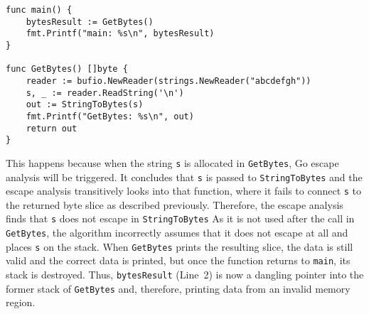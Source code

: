\begin{lstlisting}[language=Golang, label=lst:escape-analysis, caption=Escape analysis flaw example, float, belowskip=-1.5em]
func main() {
	bytesResult := GetBytes()
	fmt.Printf("main: %s\n", bytesResult)
}

func GetBytes() []byte {
	reader := bufio.NewReader(strings.NewReader("abcdefgh"))
	s, _ := reader.ReadString('\n')
	out := StringToBytes(s)
	fmt.Printf("GetBytes: %s\n", out)
	return out
}
\end{lstlisting}

This happens because when the string \texttt{s} is allocated in \texttt{GetBytes}, Go escape analysis will be triggered. %
It concludes that \texttt{s} is passed to \texttt{StringToBytes} and the escape analysis transitively looks into that function, where it fails to connect \texttt{s} to the returned byte slice as described previously.
Therefore, the escape analysis finds that \texttt{s} does not escape in \texttt{StringToBytes} 
As it is not used after the call in \texttt{GetBytes}, the algorithm incorrectly assumes that it does not escape at all and places \texttt{s} on the stack.
When \texttt{GetBytes} prints the resulting slice, the data is still valid and the correct data is printed, but once the function returns to \texttt{main}, its stack is destroyed.
Thus, \texttt{bytesResult} (Line~2) is now a dangling pointer into the former stack of \texttt{GetBytes} and, therefore, printing data from an invalid memory region.


%
%


